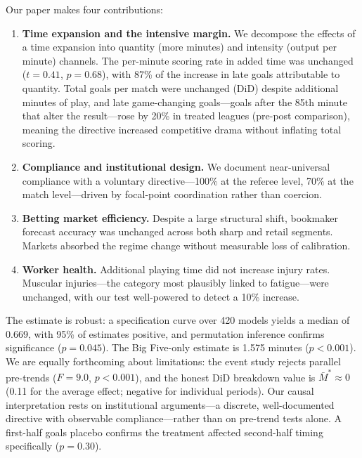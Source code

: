 \documentclass[12pt]{article}
\begin{document}
Our paper makes four contributions:
\begin{enumerate}
    \item \textbf{Time expansion and the intensive margin.} We decompose the effects of a time expansion into quantity (more minutes) and intensity (output per minute) channels. The per-minute scoring rate in added time was unchanged ($t = 0.41$, $p = 0.68$), with 87\% of the increase in late goals attributable to quantity. Total goals per match were unchanged (DiD) despite additional minutes of play, and late game-changing goals---goals after the 85th minute that alter the result---rose by 20\% in treated leagues (pre-post comparison), meaning the directive increased competitive drama without inflating total scoring.
    \item \textbf{Compliance and institutional design.} We document near-universal compliance with a voluntary directive---100\% at the referee level, 70\% at the match level---driven by focal-point coordination rather than coercion.
    \item \textbf{Betting market efficiency.} Despite a large structural shift, bookmaker forecast accuracy was unchanged across both sharp and retail segments. Markets absorbed the regime change without measurable loss of calibration.
    \item \textbf{Worker health.} Additional playing time did not increase injury rates. Muscular injuries---the category most plausibly linked to fatigue---were unchanged, with our test well-powered to detect a 10\% increase.
\end{enumerate}

The estimate is robust: a specification curve over 420 models yields a median of 0.669, with 95\% of estimates positive, and permutation inference confirms significance ($p = 0.045$). The Big Five-only estimate is 1.575 minutes ($p < 0.001$). We are equally forthcoming about limitations: the event study rejects parallel pre-trends ($F = 9.0$, $p < 0.001$), and the \citet{rambachan2023more} honest DiD breakdown value is $\bar{M}^* \approx 0$ (0.11 for the average effect; negative for individual periods). Our causal interpretation rests on institutional arguments---a discrete, well-documented directive with observable compliance---rather than on pre-trend tests alone. A first-half goals placebo confirms the treatment affected second-half timing specifically ($p = 0.30$).
\end{document}
